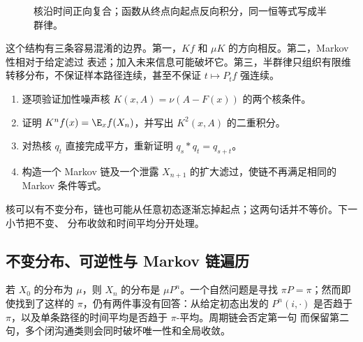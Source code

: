 \begin{figure}[htbp]
\centering
{}
\caption{核沿时间正向复合；函数从终点向起点反向积分，同一恒等式写成半群律。}
\label{fig:6-3-1-kernel-semigroup}
\end{figure}

这个结构有三条容易混淆的边界。第一，$Kf$ 和 $\mu K$ 的方向相反。第二，Markov 性相对于给定滤过
表述；加入未来信息可能破坏它。第三，半群律只组织有限维转移分布，不保证样本路径连续，甚至不保证
$t\mapsto P_tf$ 强连续。

\begin{exercise}
\begin{enumerate}
 \item 逐项验证加性噪声核 $K(x,A)=\nu(A-F(x))$ 的两个核条件。
 \item 证明 $K^nf(x)=\E_xf(X_n)$，并写出 $K^2(x,A)$ 的二重积分。
 \item 对热核 $q_t$ 直接完成平方，重新证明 $q_s*q_t=q_{s+t}$。
 \item 构造一个 Markov 链及一个泄露 $X_{n+1}$ 的扩大滤过，使链不再满足相同的 Markov 条件等式。
\end{enumerate}
\end{exercise}

核可以有不变分布，链也可能从任意初态逐渐忘掉起点；这两句话并不等价。下一小节把不变、
分布收敛和时间平均分开处理。

\subsection{不变分布、可逆性与 Markov 链遍历}\label{subsec:6-3-2}

若 $X_0$ 的分布为 $\mu$，则 $X_n$ 的分布是 $\mu P^n$。一个自然问题是寻找
$\pi P=\pi$；然而即使找到了这样的 $\pi$，仍有两件事没有回答：从给定初态出发的
$P^n(i,\cdot)$ 是否趋于 $\pi$，以及单条路径的时间平均是否趋于 $\pi$-平均。周期链会否定第一句
而保留第二句，多个闭沟通类则会同时破坏唯一性和全局收敛。

